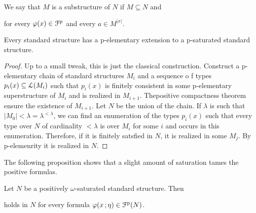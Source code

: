 \documentclass{amsproc}
\renewcommand*{\emph}[1]{%
   \smash{\tikz[baseline]\node[rectangle, fill=teal!25, rounded corners, inner xsep=0.5ex, inner ysep=0.2ex, anchor=base, minimum height = 2.7ex]{\strut #1};}}
\begin{document}
We say that $M$ is a \emph{p-elementary\/} substructure of $N$ if $M\subseteq N$ and


for every $\varphi(x)\in{\EuScript F}^{\rm p}$ and every $a\in M^{|x|}$.

\begin{theorem}
  Every standard structure has a p-elementary extension to a p-satu\-rated standard structure.
\end{theorem}

\begin{proof}
  Up to a small tweak, this is just the classical construction.
  Construct a p-elementary chain of standard structures $M_i$ and a sequence o f types $p_i(x)\subseteq{\EuScript L}(M_i)$ such that $p_i(x)$ is finitely consistent in some p-elementary superstructure of $M_i$ and is realized in $M_{i+1}$.
  Thepositive compactness theorem ensure the existence of $M_{i+1}$.
  Let $N$ be the union of the chain.
  If $\lambda$ is such that $|M_0|<\lambda=\lambda^{<\lambda}$, we can find an enumeration of the types $p_i(x)$ such that every type over $N$ of cardinality $<\lambda$ is over $M_i$ for some $i$ and occurs in this enumeration.
  Therefore, if it is finitely satsfied in $N$, it is realized in some $M_j$.
  By p-elemenrity it is realized in $N$.
\end{proof}





The following proposition shows that a slight amount of saturation tames the positive formulas.

\begin{proposition}\label{prop_approx}
  Let $N$ be a positively $\omega$-saturated standard structure.
  Then 
  
  
  holds in $N$ for every formula $\varphi(x\,;\eta)\in{\EuScript F}^{\rm p}(N)$.
\end{proposition}
\end{document}

